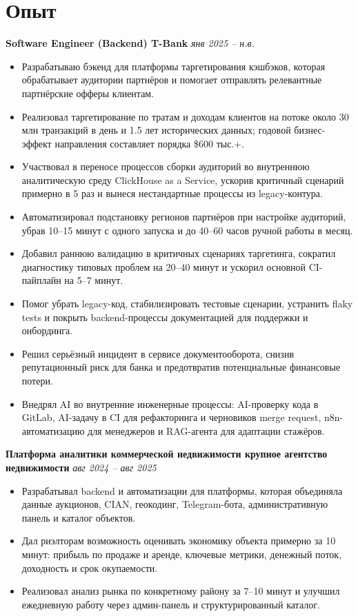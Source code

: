 \documentclass[10pt,a4paper]{article}
\begin{document}
\section*{Опыт}

\textbf{Software Engineer (Backend) \textbar{} T-Bank} \hfill \textit{янв 2025 -- н.в.}
\begin{itemize}
  \item Разрабатываю бэкенд для платформы таргетирования кэшбэков, которая обрабатывает аудитории партнёров и помогает отправлять релевантные партнёрские офферы клиентам.
  \item Реализовал таргетирование по тратам и доходам клиентов на потоке около 30 млн транзакций в день и 1.5 лет исторических данных; годовой бизнес-эффект направления составляет порядка \$600 тыс.+.
  \item Участвовал в переносе процессов сборки аудиторий во внутреннюю аналитическую среду ClickHouse as a Service, ускорив критичный сценарий примерно в 5 раз и вынеся нестандартные процессы из legacy-контура.
  \item Автоматизировал подстановку регионов партнёров при настройке аудиторий, убрав 10--15 минут с одного запуска и до 40--60 часов ручной работы в месяц.
  \item Добавил раннюю валидацию в критичных сценариях таргетинга, сократил диагностику типовых проблем на 20--40 минут и ускорил основной CI-пайплайн на 5--7 минут.
  \item Помог убрать legacy-код, стабилизировать тестовые сценарии, устранить flaky tests и покрыть backend-процессы документацией для поддержки и онбординга.
  \item Решил серьёзный инцидент в сервисе документооборота, снизив репутационный риск для банка и предотвратив потенциальные финансовые потери.
  \item Внедрял AI во внутренние инженерные процессы: AI-проверку кода в GitLab, AI-задачу в CI для рефакторинга и черновиков merge request, n8n-автоматизацию для менеджеров и RAG-агента для адаптации стажёров.
\end{itemize}

\textbf{Платформа аналитики коммерческой недвижимости \textbar{} крупное агентство недвижимости} \hfill \textit{авг 2024 -- авг 2025}
\begin{itemize}
  \item Разрабатывал backend и автоматизации для платформы, которая объединяла данные аукционов, CIAN, геокодинг, Telegram-бота, административную панель и каталог объектов.
  \item Дал риэлторам возможность оценивать экономику объекта примерно за 10 минут: прибыль по продаже и аренде, ключевые метрики, денежный поток, доходность и срок окупаемости.
  \item Реализовал анализ рынка по конкретному району за 7--10 минут и улучшил ежедневную работу через админ-панель и структурированный каталог.
\end{itemize}
\end{document}
